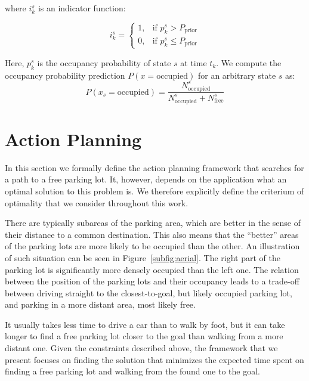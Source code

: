 where $i_k^s$ is an indicator function:

\begin{equation}
i_k^s = \begin{cases}
1, & \mbox{if } p_k^s > P_\mathrm{prior} \\
0, & \mbox{if } p_k^s \leq P_\mathrm{prior}
\end{cases}
\end{equation}

Here, $p_k^s$ is the occupancy probability of state $s$ at time $t_k$. We compute the occupancy probability prediction $P(x = \mathrm{occupied})$ for an arbitrary state $s$ as:
\begin{equation}
P(x_s = \mathrm{occupied}) = \frac{N_\mathrm{occupied}^s}{N_\mathrm{occupied}^s + N_\mathrm{free}^s}
\end{equation}



\section{Action Planning} %
\label{sec:action_planning}

In this section we formally define the action planning framework that searches
for a path to a free parking lot. It, however, depends on the application what
an optimal solution to this problem is. We therefore explicitly define the
criterium of optimality that we consider throughout this work.

There are typically subareas of the parking area, which are better in the
sense of their distance to a common destination. This also means that the
``better'' areas of the parking lots are more likely to be occupied than the
other. An illustration of such situation can be seen in
Figure~\ref{subfig:aerial}. The right part of the parking lot is significantly
more densely occupied than the left one. The relation between the position of
the parking lots and their occupancy leads to a trade-off between driving
straight to the closest-to-goal, but likely occupied parking lot, and parking
in a more distant area, most likely free.

It usually takes less time to drive a car than to walk by foot, but it can
take longer to find a free parking lot closer to the goal than walking from a
more distant one. Given the constraints described above, the framework that we
present focuses on finding the solution that minimizes the expected time spent
on finding a free parking lot and walking from the found one to the goal.

